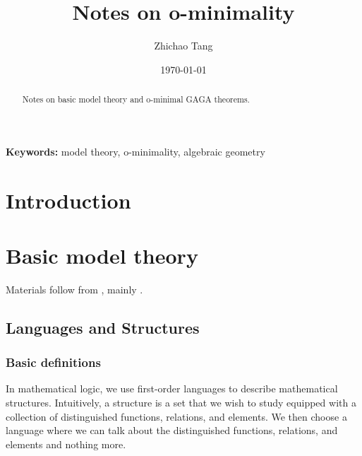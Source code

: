 \documentclass[
	fontsize=10pt, %
]{kaohandt}
\begin{document}

\title[Notes on o-minimality]{Notes on o-minimality}

\author[ZT]{Zhichao Tang}

\date{\today}


\maketitle

\margintoc

\begin{abstract}
\noindent
Notes on basic model theory and o-minimal GAGA theorems.
\end{abstract}

{\noindent\textbf{Keywords:} model theory, o-minimality, algebraic geometry}

\medskip


\section{Introduction}



\section{Basic model theory}
Materials follow from \cite{zbMATH01821671,zbMATH01160037},
mainly \cite{zbMATH01821671}.
\subsection{Languages and Structures}
\subsubsection{Basic definitions}
In mathematical logic, 
we use first-order languages to describe mathematical structures. 
Intuitively, a structure is a set that we wish to study equipped with a collection of distinguished functions, relations, and elements. 
We then choose a language where we can talk about the distinguished functions, relations, and elements and nothing more.
\end{document}
